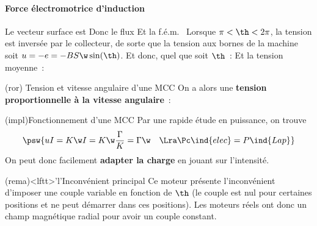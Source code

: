 \documentclass[../../main/main.tex]{subfiles}
\begin{document}
\paragraph*{Force électromotrice d'induction}
Le vecteur surface est
\psw{%
	\[
		\vv{S} = S\cos(\th)\uy + S\sin(\th)\ux
	\]
	\vspace{-10pt}
}%
Donc le flux
\psw{%
	\[
		\F = SB\cos(\th)
	\]
	\vspace{-10pt}
}%
Et la f.é.m.\
%
Lorsque $\pi < \th < 2\pi$, la tension est inversée par le collecteur, de sorte
que la tension aux bornes de la machine soit $u = -e = -BS\w\sin(\th)$. Et donc,
quel que soit $\th$~:
\psw{%
	\[
		\boxed{u = BS\w \abs{\sin(\th)}}
	\]
}%
Et la tension moyenne~:
%
\begin{tcb*}[list entry={\lte Tension et vitesse ang.\ d'une MCC}](ror)
	{Tension et vitesse angulaire d'une MCC}
	On a alors une \textbf{tension proportionnelle à la vitesse angulaire}~:
	\psw{%
		\[
			\moy{u} = K\w
			\qav
			K = 4BS/\pi
		\]
	}%
\end{tcb*}
\begin{tcb*}(impl){Fonctionnement d'une MCC}
	Par une rapide étude en puissance, on trouve
	\[
		\psw{%
			uI = K\w I = K\w \frac{\Gamma}{K} = \Gamma\w
			\quad
			\Lra
			\Pc\ind{elec} = P\ind{Lap}
		}%
	\]
	On peut donc facilement \textbf{adapter la charge} en jouant sur l'intensité.
\end{tcb*}

\begin{tcb*}(rema)<lftt>'l'{Inconvénient principal}
	Ce moteur présente l'inconvénient d'imposer une couple variable en
	fonction de $\th$ (le couple est nul pour certaines positions et ne peut
	démarrer dans ces positions). Les moteurs réels ont donc un champ
	magnétique radial pour avoir un couple constant.
\end{tcb*}
\end{document}

